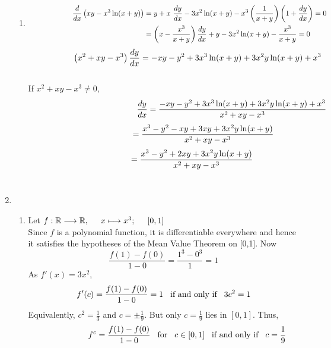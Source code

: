 \documentclass[12pt]{amsart}
\begin{document}
\begin{enumerate}
\begin{enumerate}
			\item
				\begin{align}
					\hspace{2.1cm}\frac{ d} {dx} \left(xy-x^3 \ln(x+y) \right) & = y + x \text{ } \frac{dy}{dx} - 					3x^2 \ln(x+y) - x^3 \left(\frac{1}{x+y}\right) \left(1+\frac{dy}{dx}\right) = 0 \notag \\
					& = \left(x-\frac{x^3}{x+y}\right) \frac{dy}{dx} +y - 3x^2 \ln(x+y) - \frac{x^3}{x+y} =0 						\notag
				\end{align}
				$$\hspace{1.9cm}\left(x^2+xy-x^3\right) \frac{dy}{dx} = -xy-y^2+3x^3\ln(x+y)+3x^2y
				\ln(x+y)+x^3$$ \\
				If $x^2+xy-x^3 \ne 0$,
				$$\hspace{4.7cm}\frac{dy}{dx} = \frac{-xy-y^2+3x^3\ln(x+y)+3x^2y \ln(x+y)+x^3}{x^2+xy-					x^3}$$
				$$\hspace{3.4cm} = \frac{x^3-y^2-xy+3xy+3x^2y\ln(x+y)}{x^2+xy-x^3}$$
				$$\hspace{2.45cm} = \frac{x^3-y^2+2xy+3x^2y\ln(x+y)}{x^2+xy-x^3}$$
				\\
		\end{enumerate}
								
	\item 
	
		\begin{enumerate}
		
			\item Let $f: \mathbb{R}\longrightarrow\mathbb{R},\hspace{0.5cm} x\longmapsto x^3; 
			\hspace{0.5cm} [0,1]$ \\
			Since $f$ is a polynomial function, it is differentiable everywhere and hence it satisfies the 
			hypotheses of the Mean Value Theorem on [0,1]. Now
			$$\frac{f(1)-f(0)}{1-0} = \frac{1^3-0^3}{1} = 1$$
			As $f'(x)=3x^2$, 
			$$f'(c)=\frac{f(1)-f(0)}{1-0}=1 \hspace{0.3cm} \text{if and only if} \hspace{0.3cm} 3c^2=1$$
			Equivalently, $c^2=\frac{1}{3}$ and $c=\pm \frac{1}{9}$. But only $c=\frac{1}{9}$ lies in $[0,1]$.  			Thus,
			$$\hspace{2cm} f^c=\frac{f(1)-f(0)}{1-0} \hspace{0.3cm} \text{for} \hspace{0.3cm} c \in [0,1] 				\hspace{0.3cm} \text{if and only if} \hspace{0.3cm} c = \frac{1}{9}$$
											

\end{enumerate}
\end{enumerate}
\end{document}

